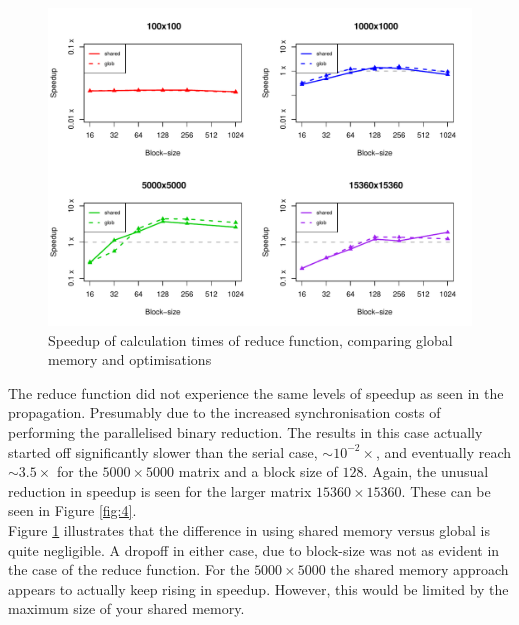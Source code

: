 \documentclass[12pt]{article}
\begin{document}
\begin{figure}
	\centering
	\includegraphics[width=\linewidth]{../plots/red_globvshared.pdf}
	\caption{Speedup of calculation times of reduce function, comparing global memory and optimisations}
	\label{fig:6}
\end{figure}
The reduce function did not experience the same levels of speedup as seen in the propagation. Presumably due to the increased synchronisation costs of performing the parallelised binary reduction. The results in this case actually started off significantly slower than the serial case, $\sim10^{-2}\times$, and eventually reach $\sim3.5\times$ for the $5000\times5000$ matrix and a block size of $128$. Again, the unusual reduction in speedup is seen for the larger matrix $15360\times15360$. These can be seen in Figure \ref{fig:4}.\\
Figure \ref{fig:6} illustrates that the difference in using shared memory versus global is quite negligible. A dropoff in either case, due to block-size was not as evident in the case of the reduce function. For the $5000\times5000$ the shared memory approach appears to actually keep rising in speedup. However, this would be limited by the maximum size of your shared memory.
\end{document}
